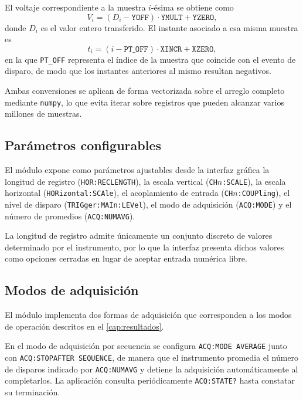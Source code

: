 El voltaje correspondiente a la muestra $i$-ésima se obtiene como
\begin{equation}
    V_i = \left(D_i - \texttt{YOFF}\right)\cdot \texttt{YMULT}
          + \texttt{YZERO},
    \label{eq:conv_voltaje}
\end{equation}
donde $D_i$ es el valor entero transferido. El instante asociado a esa
misma muestra es
\begin{equation}
    t_i = \left(i - \texttt{PT\_OFF}\right)\cdot \texttt{XINCR}
          + \texttt{XZERO},
    \label{eq:conv_tiempo}
\end{equation}
en la que \texttt{PT\_OFF} representa el índice de la muestra que
coincide con el evento de disparo, de modo que los instantes
anteriores al mismo resultan negativos.

Ambas conversiones se aplican de forma vectorizada sobre el arreglo
completo mediante \texttt{numpy}, lo que evita iterar sobre registros
que pueden alcanzar varios millones de muestras.

\subsection*{Parámetros configurables}

El módulo expone como parámetros ajustables desde la interfaz gráfica
la longitud de registro (\texttt{HOR:RECLENGTH}), la escala vertical
(\texttt{CH$n$:SCALE}), la escala horizontal
(\texttt{HORizontal:SCAle}), el acoplamiento de entrada
(\texttt{CH$n$:COUPling}), el nivel de disparo
(\texttt{TRIGger:MAIn:LEVel}), el modo de adquisición
(\texttt{ACQ:MODE}) y el número de promedios (\texttt{ACQ:NUMAVG}).

La longitud de registro admite únicamente un conjunto discreto de
valores determinado por el instrumento, por lo que la interfaz
presenta dichos valores como opciones cerradas en lugar de aceptar
entrada numérica libre.

\subsection*{Modos de adquisición}

El módulo implementa dos formas de adquisición que corresponden a los
modos de operación descritos en el \cref{cap:resultados}.

En el modo de adquisición por secuencia se configura
\texttt{ACQ:MODE AVERAGE} junto con
\texttt{ACQ:STOPAFTER SEQUENCE}, de manera que el instrumento
promedia el número de disparos indicado por \texttt{ACQ:NUMAVG} y
detiene la adquisición automáticamente al completarlos. La aplicación
consulta periódicamente \texttt{ACQ:STATE?} hasta constatar su
terminación.

